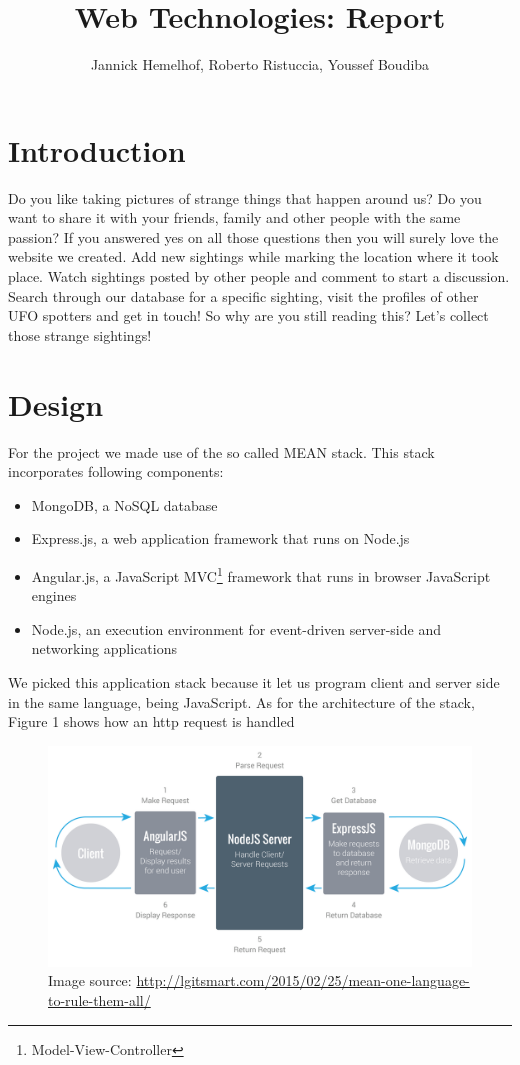 \documentclass{article}
\title{Web Technologies: Report}
\author{Jannick Hemelhof, Roberto Ristuccia, Youssef Boudiba}
\begin{document}
\maketitle
\newpage
\tableofcontents
\newpage
{}

\section{Introduction}
Do you like taking pictures of strange things that happen around us? Do you want to share it with your friends, family and other people with the same passion? If you answered yes on all those questions then you will surely love the website we created. Add new sightings while marking the location where it took place. Watch sightings posted by other people and comment to start a discussion. Search through our database for a specific sighting, visit the profiles of other UFO spotters and get in touch! So why are you still reading this? Let's collect those strange sightings!

\section{Design}
For the project we made use of the so called MEAN stack. This stack incorporates following components:
\begin{itemize}
\item MongoDB, a NoSQL database
\item Express.js, a web application framework that runs on Node.js
\item Angular.js, a JavaScript MVC\footnote{Model-View-Controller} framework that runs in browser JavaScript engines
\item Node.js, an execution environment for event-driven server-side and networking applications
\end{itemize}
We picked this application stack because it let us program client and server side in the same language, being JavaScript. 
As for the architecture of the stack, Figure 1 shows how an http request is handled
\begin{figure}[hb]%
  \centering
  \includegraphics[width=15cm]{architecture}
  \caption{Image source: \url{http://lgitsmart.com/2015/02/25/mean-one-language-to-rule-them-all/}}
  \label{fig:test}
\end{figure}
\end{document}
